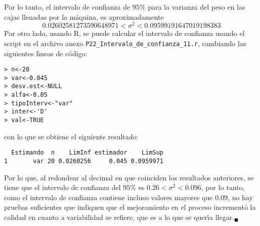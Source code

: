 \begin{solucion}
\begin{equation*}
 \end{equation*}
 Por lo tanto, el intervalo de confianza de $95\%$ para la varianza del peso en las cajas llenadas por la m\'aquina, es aproximadamente
 \begin{equation*}
  0.02602581273590648971 < \sigma^2 < 0.09599191647019198383
 \end{equation*}
 Por otro lado, usando R, se puede calcular el intervalo de confianza usando el script en el archivo anexo \texttt{P22\_Intervalo\_de\_confianza\_11.r}, cambiando las siguientes l\'{\i}neas de c\'odigo:
 \begin{verbatim}
> n<-20
> var<-0.045
> desv.est<-NULL
> alfa<-0.05
> tipoInterv<-"var"
> inter<-'D'
> val<-TRUE
 \end{verbatim}
 \vspace{-0.5cm}
 con lo que se obtiene el siguiente resultado:
 \begin{verbatim}
  Estimando  n    LimInf estimador    LimSup
1       var 20 0.0260256     0.045 0.0959971
 \end{verbatim}
 \vspace{-0.5cm}
 Por lo que, al redondear al decimal en que coinciden los resultados anteriores, se tiene que el intervalo de confianza del $95\%$ es $0.26 < \sigma^2 < 0.096$, por lo tanto, como el intervalo de confianza contiene incluso valores mayores que $0.09$, no hay pruebas suficientes que indiquen que el mejoramiento en el proceso increment\'o la calidad en cuanto a variabilidad se refiere, que es a lo que se quer\'{\i}a llegar.${}_{\blacksquare}$
\end{solucion}

